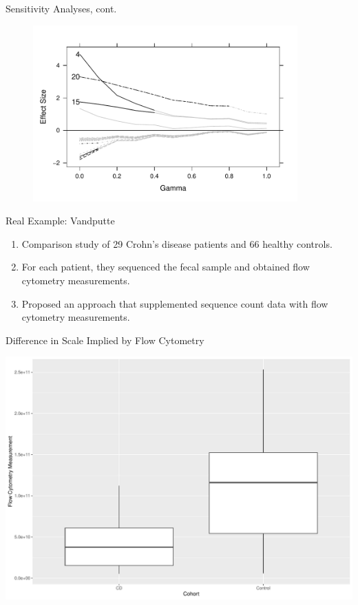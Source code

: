 \documentclass[
  ignorenonframetext,
]{beamer}
\begin{document}
\begin{frame}{Sensitivity Analyses, cont.}
\protect\hypertarget{sensitivity-analyses-cont.}{}
\begin{figure}
  \centering
  \includegraphics[width=4in]{figures/sim_gamma.pdf}
\end{figure}
\end{frame}

\begin{frame}{Real Example: Vandputte}
\protect\hypertarget{real-example-vandputte}{}
\begin{enumerate}
\item
  Comparison study of 29 Crohn's disease patients and 66 healthy
  controls.
\item
  For each patient, they sequenced the fecal sample and obtained flow
  cytometry measurements.
\item
  Proposed an approach that supplemented sequence count data with flow
  cytometry measurements.
\end{enumerate}
\end{frame}

\begin{frame}{Difference in Scale Implied by Flow Cytometry}
\protect\hypertarget{difference-in-scale-implied-by-flow-cytometry}{}
\begin{center}\includegraphics[width=0.95\linewidth]{slides_files/figure-beamer/unnamed-chunk-13-1} \end{center}
\end{frame}
\end{document}
